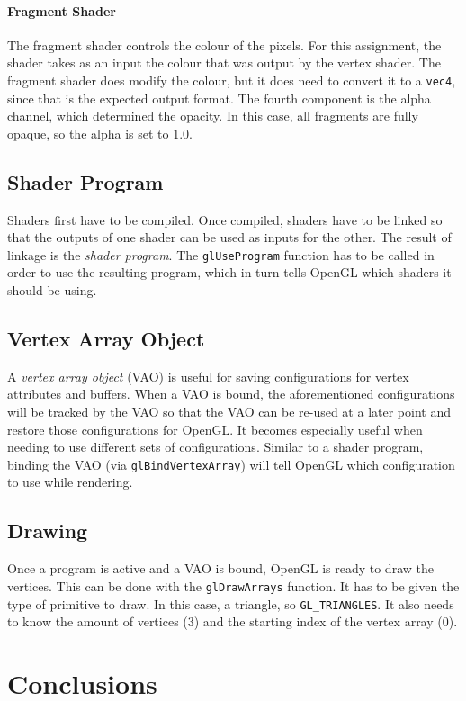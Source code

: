 \documentclass[a4paper, 12pt]{scrartcl}
\begin{document}
\paragraph{Fragment Shader}
The fragment shader controls the colour of the pixels. For this assignment, the shader takes as an input the colour that was output by the vertex shader. The fragment shader does modify the colour, but it does need to convert it to a \texttt{vec4}, since that is the expected output format. The fourth component is the alpha channel, which determined the opacity. In this case, all fragments are fully opaque, so the alpha is set to $1.0$.

\subsection{Shader Program}
Shaders first have to be compiled. Once compiled, shaders have to be linked so that the outputs of one shader can be used as inputs for the other. The result of linkage is the \textit{shader program}. The \texttt{glUseProgram} function has to be called in order to use the resulting program, which in turn tells OpenGL which shaders it should be using.

\subsection{Vertex Array Object}
A \textit{vertex array object} (VAO) is useful for saving configurations for vertex attributes and buffers. When a VAO is bound, the aforementioned configurations will be tracked by the VAO so that the VAO can be re-used at a later point and restore those configurations for OpenGL. It becomes especially useful when needing to use different sets of configurations. Similar to a shader program, binding the VAO (via \texttt{glBindVertexArray}) will tell OpenGL which configuration to use while rendering.

\subsection{Drawing}
Once a program is active and a VAO is bound, OpenGL is ready to draw the vertices. This can be done with the \texttt{glDrawArrays} function. It has to be given the type of primitive to draw. In this case, a triangle, so \texttt{GL\_TRIANGLES}. It also needs to know the amount of vertices (3) and the starting index of the vertex array (0).

\section{Conclusions}
\end{document}
